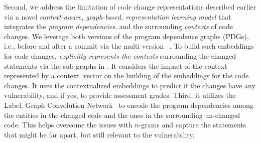 Second, we address the limitation of code change representations described earlier via
a novel
{\em context-aware, graph-based, representation learning model}
that
integrates the {\em program dependencies}, and the surrounding {\em
  contexts} of code changes. We leverage both versions of the program
dependence graphs (PDGs), i.e., before and after a commit via the multi-version {\mvpdg}~\cite{flexeme-fse20}. To build such embeddings
for code changes, {\tool} {\em explicitly represents the contexts}
surrounding the changed statements via the sub-graphs in {\mvpdg}. It
considers the impact of the context represented by a
context~vector on the building of the embeddings for the code
changes. It uses the contextualized embeddings to predict if the
changes have any vulnerability, and if yes, to provide assessment
grades. Third, it utilizes the Label, Graph Convolution
Network~\cite{label-gcn} to encode the program dependencies
among the entities in the changed code and the ones in the surrounding
un-changed code. This helps overcome the issues with $n$-grams and
capture the statements that might be far apart, but still relevant to the
vulnerability.

